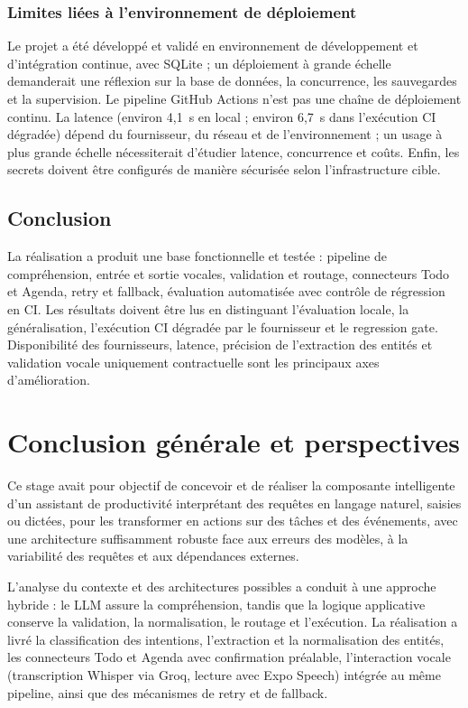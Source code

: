 \documentclass[11pt,a4paper,openany,oneside]{report}
\newcommand{\chapconcl}{\section*{Conclusion}\phantomsection\addcontentsline{toc}{section}{Conclusion}}
\begin{document}
\subsection{Limites liées à l'environnement de déploiement}\label{sec:limites-deploiement}
Le projet a été développé et validé en environnement de développement et d'intégration continue, avec SQLite ; un déploiement à grande échelle demanderait une réflexion sur la base de données, la concurrence, les sauvegardes et la supervision. Le pipeline GitHub Actions n'est pas une chaîne de déploiement continu. La latence (environ 4,1~s en local ; environ 6,7~s dans l'exécution CI dégradée) dépend du fournisseur, du réseau et de l'environnement ; un usage à plus grande échelle nécessiterait d'étudier latence, concurrence et coûts. Enfin, les secrets doivent être configurés de manière sécurisée selon l'infrastructure cible.

\chapconcl
La réalisation a produit une base fonctionnelle et testée : pipeline de compréhension, entrée et sortie vocales, validation et routage, connecteurs Todo et Agenda, retry et fallback, évaluation automatisée avec contrôle de régression en CI. Les résultats doivent être lus en distinguant l'évaluation locale, la généralisation, l'exécution CI dégradée par le fournisseur et le regression gate. Disponibilité des fournisseurs, latence, précision de l'extraction des entités et validation vocale uniquement contractuelle sont les principaux axes d'amélioration.

\chapter*{Conclusion générale et perspectives}
Ce stage avait pour objectif de concevoir et de réaliser la composante intelligente d'un assistant de productivité interprétant des requêtes en langage naturel, saisies ou dictées, pour les transformer en actions sur des tâches et des événements, avec une architecture suffisamment robuste face aux erreurs des modèles, à la variabilité des requêtes et aux dépendances externes.

L'analyse du contexte et des architectures possibles a conduit à une approche hybride : le LLM assure la compréhension, tandis que la logique applicative conserve la validation, la normalisation, le routage et l'exécution. La réalisation a livré la classification des intentions, l'extraction et la normalisation des entités, les connecteurs Todo et Agenda avec confirmation préalable, l'interaction vocale (transcription Whisper via Groq, lecture avec Expo Speech) intégrée au même pipeline, ainsi que des mécanismes de retry et de fallback.
\end{document}
